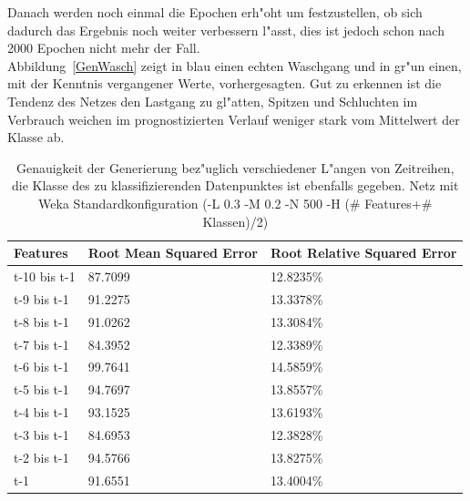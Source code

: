 Danach werden noch einmal die Epochen erh"oht um festzustellen, ob sich dadurch das Ergebnis noch weiter verbessern l"asst, dies ist jedoch schon nach 2000 Epochen nicht mehr der Fall. \\

Abbildung~\ref{GenWasch} zeigt in blau einen echten Waschgang und in gr"un einen, mit der Kenntnis vergangener Werte, vorhergesagten. Gut zu erkennen ist die Tendenz des Netzes den Lastgang zu gl"atten, Spitzen und Schluchten im Verbrauch weichen im prognostizierten Verlauf weniger stark vom Mittelwert der Klasse ab.

\begin{table}[h]
\begin{tabular}{l|p{4cm}|p{4cm}}
Features & Root Mean Squared Error & Root Relative Squared Error \\
\hline
t-10 bis t-1 & 87.7099 & 12.8235\% \\
t-9 bis t-1 & 91.2275 & 13.3378\% \\
t-8 bis t-1 & 91.0262 & 13.3084\% \\
t-7 bis t-1 & 84.3952 & 12.3389\% \\
t-6 bis t-1 & 99.7641 & 14.5859\% \\
t-5 bis t-1 & 94.7697 & 13.8557\% \\
t-4 bis t-1 & 93.1525 & 13.6193\% \\
t-3 bis t-1 & 84.6953 & 12.3828\% \\
t-2 bis t-1 & 94.5766 & 13.8275\% \\
t-1 & 91.6551 & 13.4004\% 
\end{tabular}
\caption[Generierung mit Zeitreihen Features]{Genauigkeit der Generierung bez"uglich verschiedener L"angen von Zeitreihen, die Klasse des zu klassifizierenden Datenpunktes ist ebenfalls gegeben. Netz mit Weka Standardkonfiguration (-L 0.3 -M 0.2 -N 500 -H (\# Features+\# Klassen)/2)}
\label{GenZeit}
\end{table}


